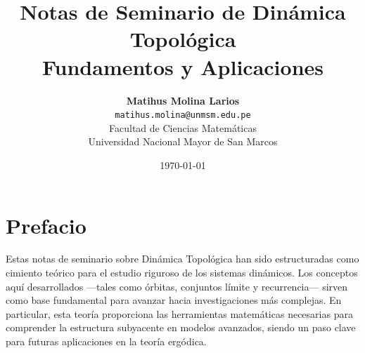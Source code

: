 \documentclass[12pt, a4paper, oneside]{book}
\title{
	\Huge \textbf{Notas de Seminario de Dinámica Topológica} \\
	\vspace{0.5cm}
	\Large Fundamentos y Aplicaciones
}
\author{
	\textbf{Matihus Molina Larios} \\
	\texttt{matihus.molina@unmsm.edu.pe} \\
	Facultad de Ciencias Matemáticas \\
	Universidad Nacional Mayor de San Marcos
}
\date{\today}
\theoremstyle{definition}
\theoremstyle{plain}
\numberwithin{figure}{section}
\numberwithin{equation}{section}
\begin{document}
	
	\frontmatter
	\maketitle
	
	\chapter*{Prefacio}
	Estas notas de seminario sobre Dinámica Topológica han sido estructuradas como cimiento teórico para el estudio riguroso de los sistemas dinámicos. Los conceptos aquí desarrollados —tales como órbitas, conjuntos límite y recurrencia— sirven como base fundamental para avanzar hacia investigaciones más complejas. En particular, esta teoría proporciona las herramientas matemáticas necesarias para comprender la estructura subyacente en modelos avanzados, siendo un paso clave para futuras aplicaciones en la teoría ergódica.
	
	\tableofcontents
	
	\mainmatter
	
	
	
	
	
	
	
	
	
	
	
	
	
	
	
\end{document}
